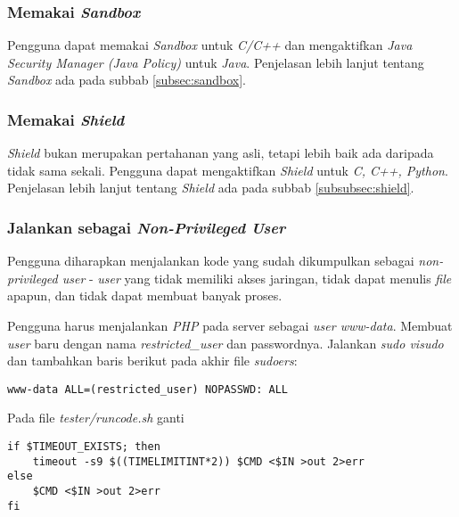 \subsubsection{Memakai \textit{Sandbox}}
\label{subsubsec:memakai_sandbox}
Pengguna dapat memakai \textit{Sandbox} untuk \textit{C/C++} dan mengaktifkan \textit{Java Security Manager (Java Policy)} untuk \textit{Java}. Penjelasan lebih lanjut tentang \textit{Sandbox} ada pada subbab \ref{subsec:sandbox}.

\subsubsection{Memakai \textit{Shield}}
\label{subsubsec:memakai_shield}
\textit{Shield} bukan merupakan pertahanan yang asli, tetapi lebih baik ada daripada tidak sama sekali. Pengguna dapat mengaktifkan \textit{Shield} untuk \textit{C, C++, Python}. Penjelasan lebih lanjut tentang \textit{Shield} ada pada subbab \ref{subsubsec:shield}.

\subsubsection{Jalankan sebagai \textit{Non-Privileged User}}
\label{subsubsec:non_prileged_user}
Pengguna diharapkan menjalankan kode yang sudah dikumpulkan sebagai \textit{non-privileged user} - \textit{user} yang tidak memiliki akses jaringan, tidak dapat menulis \textit{file} apapun, dan tidak dapat membuat banyak proses.

Pengguna harus menjalankan \textit{PHP} pada server sebagai \textit{user www-data}. Membuat \textit{user} baru dengan nama \textit{restricted\_user} dan passwordnya. Jalankan \textit{sudo visudo} dan tambahkan baris berikut pada akhir file \textit{sudoers}:

\begin{lstlisting}[basicstyle=\ttfamily, frame=single,
columns=fullflexible, keepspaces=true, breaklines=true, label=ls:13]
www-data ALL=(restricted_user) NOPASSWD: ALL
\end{lstlisting}

Pada file \textit{tester/runcode.sh} ganti 

\begin{lstlisting}[basicstyle=\ttfamily, frame=single,
columns=fullflexible, keepspaces=true, breaklines=true, label=ls:14]
if $TIMEOUT_EXISTS; then
	timeout -s9 $((TIMELIMITINT*2)) $CMD <$IN >out 2>err
else
	$CMD <$IN >out 2>err        
fi
\end{lstlisting}

